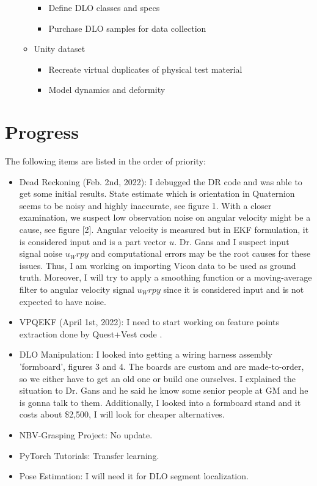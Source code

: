 \documentclass[11pt]{article}
\begin{document}
\begin{itemize}
\begin{itemize}
\begin{itemize}
            \item Define DLO classes and specs
            \item Purchase DLO samples for data collection
      \end{itemize}
      \item Unity dataset
      \begin{itemize}
            \item Recreate virtual duplicates of physical test material
            \item Model dynamics and deformity
      \end{itemize}
  \end{itemize}
\end{itemize}


\section{Progress}
The following items are listed in the order of priority:
\begin{itemize}
      \item Dead Reckoning (Feb. 2nd, 2022): I debugged the DR code and was able
      to get some initial results. State estimate which is orientation in
      Quaternion seems to be noisy and highly inaccurate, see figure 1.
      With a closer examination, we suspect low observation noise on angular
      velocity might be a cause, see figure [2]. Angular velocity is measured but
      in EKF formulation, it is considered input and is a part vector \(u\).
      Dr. Gans and I suspect input signal noise \(u_Wrpy\)
      and computational errors may be
      the root causes for these issues. Thus, I am working on importing Vicon
      data to be used as ground truth. Moreover, I will try to apply a smoothing
      function
      or a moving-average filter to angular velocity signal \(u_Wrpy\) since it is
      considered input and is not expected to have noise.
      \item VPQEKF (April 1st, 2022): I need to start working on feature points
      extraction done by Quest+Vest code \cite{quest}.
      \item DLO Manipulation: I looked into getting a wiring harness assembly
      'formboard', figures 3 and 4.
      The boards are custom and are made-to-order, so we either
      have to get an old one or build one ourselves. I explained the situation
      to Dr. Gans and he said he know some senior people at GM and he is gonna
      talk to them. Additionally, I looked into a formboard stand and it costs
      about \$2,500, I will look for cheaper alternatives.
      \item NBV-Grasping Project: No update.
      \item PyTorch Tutorials: Transfer learning.
      \item Pose Estimation: I will need it for DLO segment localization.
\end{itemize}
\end{document}
